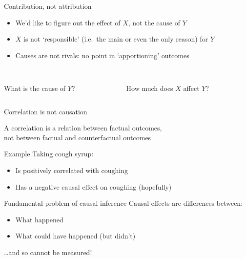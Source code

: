 \begin{frame}{Contribution, not attribution}
    \begin{itemize}
        \item We'd like to figure out the \alert{effect of $X$}, not the cause
              of $Y$
        \item $X$ is not `responsible' (i.e.\ the main or even the only reason)
              for $Y$
        \item Causes are not rivals: no point in `apportioning' outcomes
    \end{itemize}
    \vfill\pause
    \begin{columns}[t]
        \begin{column}{0.5\textwidth}
            \centering
            {\Huge\color{mLightBrown}\xmark} \\
            What is the cause of $Y$?
        \end{column}
        \begin{column}{0.5\textwidth}
            \centering
            {\Huge\color{mDarkTeal}\cmark} \\
            How much does $X$ affect $Y$?
        \end{column}
    \end{columns}
\end{frame}

\begin{frame}{Correlation is not causation}
    \begin{center}
        \large%
        A correlation is a relation between \alert{factual outcomes}, \\
        not between factual and counterfactual outcomes
    \end{center}
    \vfill\pause
    \begin{block}{Example}
        Taking cough syrup:\vspace{-1ex}
        \begin{itemize}
            \item Is \alert{positively correlated} with coughing
            \item Has a \alert{negative causal effect} on coughing (hopefully)
        \end{itemize}
    \end{block}
\end{frame}

\begin{frame}{Fundamental problem of causal inference}
    Causal effects are differences between:\vspace{-1ex}
    \begin{itemize}
        \item What happened
        \item What \alert{could have} happened (but didn't)
    \end{itemize}
    \vfill\pause
    \begin{center}
        \LARGE%
        \ldots and so cannot be measured!
    \end{center}
\end{frame}

